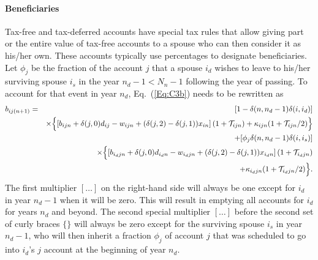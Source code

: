 \documentclass{report}[fleqn,12pt]
\begin{document}
\paragraph*{Beneficiaries}
Tax-free and tax-deferred accounts have special tax rules that allow giving part
or the entire value of
tax-free accounts to a spouse who can then consider it as his/her own.
These accounts typically use percentages to designate beneficiaries.
Let $\phi_j$ be the fraction of the account $j$ that a spouse $i_d$ wishes
to leave to his/her surviving spouse $i_s$
in the year $n_d  - 1 < N_n - 1$ following the year of passing. 
To account for that event in year $n_d$, Eq.~(\ref{Eq:C3b}) needs to be rewritten as
\begin{eqnarray}
	b_{ij(n+1)} &=& [1 - \delta(n, n_d-1)\delta(i, i_d)] \nonumber \\
	&&\times \Bigl\{\left[b_{ijn} + \delta(j, 0)d_{ij} - w_{ijn}
	+ (\delta(j, 2) - \delta(j, 1))x_{in}
	\right](1 + \mathcal{T}_{ijn})
	+ \kappa_{ijn}(1 + \mathcal{T}_{ijn}/2) 
	\Bigr\}\nonumber \\
	&& + [\phi_j\delta(n, n_d-1)\delta(i, i_s)] \nonumber  \\
	&& \times \Bigl\{\left[b_{i_djn}
	+ \delta(j, 0)d_{i_dn}
	- w_{i_djn}
	+ (\delta(j, 2) - \delta(j, 1))x_{i_dn}
	\right] (1 + \mathcal{T}_{i_djn})
	\nonumber\\
	&& + \kappa_{i_djn}(1 + \mathcal{T}_{i_djn}/2) 
	\Bigr\}.
\end{eqnarray}
The first multiplier $[\ldots]$ on the right-hand side will always be one except for $i_d$ in
year $n_d-1$ when it will be zero. This will result in emptying all accounts for $i_d$ for years
$n_d$ and beyond.
The second special multiplier $[\ldots]$ before the second set of curly braces
$\{\}$ will always be zero except for the surviving
spouse $i_s$ in year $n_d-1$, who will then inherit a fraction $\phi_j$ of account $j$ that
was scheduled to go into $i_d$'s $j$ account at the beginning of year $n_d$.
\end{document}

